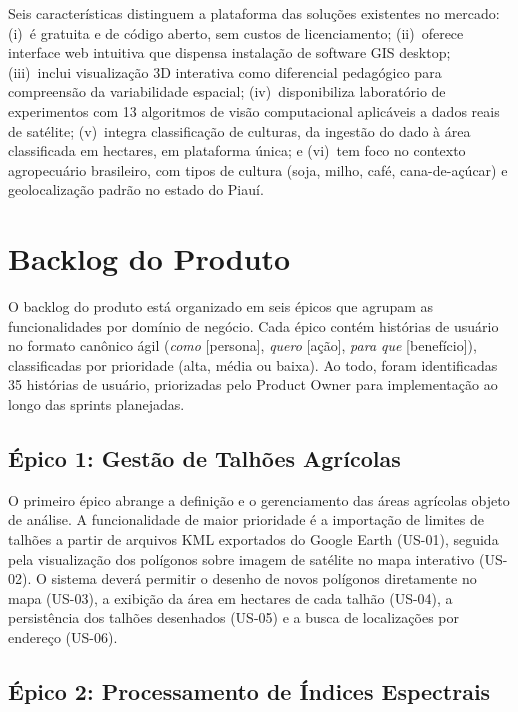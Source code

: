 \documentclass[12pt, a4paper]{article}
\begin{document}
Seis características distinguem a plataforma das soluções existentes no mercado: (i)~é gratuita e de código aberto, sem custos de licenciamento; (ii)~oferece interface web intuitiva que dispensa instalação de software GIS desktop; (iii)~inclui visualização 3D interativa como diferencial pedagógico para compreensão da variabilidade espacial; (iv)~disponibiliza laboratório de experimentos com 13 algoritmos de visão computacional aplicáveis a dados reais de satélite; (v)~integra classificação de culturas, da ingestão do dado à área classificada em hectares, em plataforma única; e (vi)~tem foco no contexto agropecuário brasileiro, com tipos de cultura (soja, milho, café, cana-de-açúcar) e geolocalização padrão no estado do Piauí.

\section{Backlog do Produto}

O backlog do produto está organizado em seis épicos que agrupam as funcionalidades por domínio de negócio. Cada épico contém histórias de usuário no formato canônico ágil (\textit{como} [persona], \textit{quero} [ação], \textit{para que} [benefício]), classificadas por prioridade (alta, média ou baixa). Ao todo, foram identificadas 35 histórias de usuário, priorizadas pelo Product Owner para implementação ao longo das sprints planejadas.

\subsection{Épico 1: Gestão de Talhões Agrícolas}

O primeiro épico abrange a definição e o gerenciamento das áreas agrícolas objeto de análise. A funcionalidade de maior prioridade é a importação de limites de talhões a partir de arquivos KML exportados do Google Earth (US-01), seguida pela visualização dos polígonos sobre imagem de satélite no mapa interativo (US-02). O sistema deverá permitir o desenho de novos polígonos diretamente no mapa (US-03), a exibição da área em hectares de cada talhão (US-04), a persistência dos talhões desenhados (US-05) e a busca de localizações por endereço (US-06).

\subsection{Épico 2: Processamento de Índices Espectrais}
\end{document}
